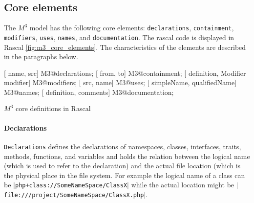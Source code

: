\documentclass[../main.tex]{subfiles}
\begin{document}
    \subsection{Core elements}
    The $M^3$ model has the following core elements: \texttt{declarations}, \texttt{containment}, \texttt{modifiers}, \texttt{uses}, \texttt{names}, and \texttt{documentation}.
    The rascal code is displayed in Rascal \ref{fig:m3_core_elements}. The characteristics of the elements are described in the paragraphs below.

    \begin{program}    
    \begin{rascal}%
 [ name,  src] M3@declarations; 
 [ from,  to] M3@containment; 
 [ definition, Modifier modifier] M3@modifiers; 
 [ src,  name] M3@uses; 
 [ simpleName,  qualifiedName] M3@names; 
 [ definition,  comments] M3@documentation; \end{rascal}%
	
	\caption{$M^3$ core definitions in Rascal}
	\label{fig:m3_core_elements}
	\end{program}
	    
    \paragraph{Declarations} \texttt{Declarations} defines the declarations of namespaces, classes, interfaces, traits, methods, functions, and variables and holds the relation between the logical name (which is used to refer to the declaration) and the actual file location (which is the physical place in the file system.
    For example the logical name of a class can be \texttt{$\vert$php+class://SomeNameSpace/ClassX$\vert$} while the actual location might be \texttt{$\vert$file:///project/SomeNameSpace/ClassX.php$\vert$}.
    
\end{document}
